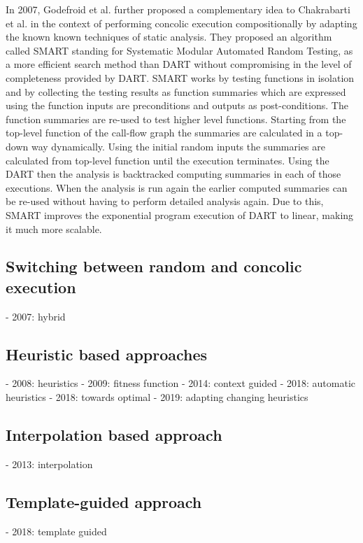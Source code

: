 \documentclass[	runningheads,
				a4paper]{llncs}
\begin{document}
In 2007, Godefroid et al. \cite{godefroid2007compositional} further proposed a complementary idea \cite{godefroid2007compositional} to Chakrabarti et al. \cite{chakrabarti2006software} in the context of performing concolic execution compositionally by adapting the known known techniques of static analysis. 
They proposed an algorithm called SMART standing for Systematic Modular Automated Random Testing, as a more efficient search method than DART \cite{godefroid2005dart} without compromising in the level of completeness provided by DART. SMART works by testing functions in isolation and by collecting the testing results as function summaries which are expressed using the function inputs are preconditions and outputs as post-conditions. The function summaries are re-used to test higher level functions. Starting from the top-level function of the call-flow graph the summaries are calculated in a top-down way dynamically. Using the initial random inputs the summaries are calculated from top-level function until the execution terminates. Using the DART then the analysis is backtracked computing summaries in each of those executions. When the analysis is run again the earlier computed summaries can be re-used without having to perform detailed analysis again. Due to this, SMART improves the exponential program execution of DART to linear, making it much more scalable.





\subsection{Switching between random and concolic execution}
- 2007: hybrid

\subsection{Heuristic based approaches}
- 2008: heuristics
- 2009: fitness function
- 2014: context guided
- 2018: automatic heuristics
- 2018: towards optimal 
- 2019: adapting changing heuristics

\subsection{Interpolation based approach}
- 2013: interpolation

\subsection{Template-guided approach}
- 2018: template guided
\end{document}
